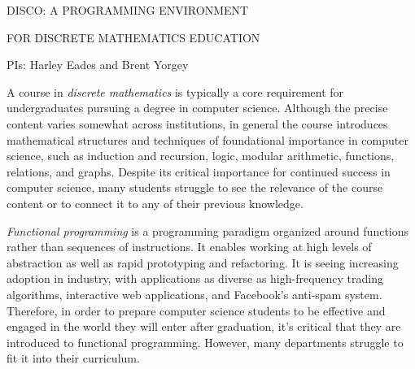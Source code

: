 \centerline{\Large DISCO: A PROGRAMMING ENVIRONMENT}
\vspace{1ex}
\centerline{\Large FOR DISCRETE MATHEMATICS EDUCATION}
\vspace{3ex}
\centerline{\large PIs: Harley Eades and Brent Yorgey}
\vspace{3ex}

\begin{comment}
  The proposal must contain a summary of the proposed activity suitable
  for publication, not more than one page in length. It should not be an
  abstract of the proposal, but rather a self-contained description of the
  activity that would result if the proposal were funded. The summary
  should be written in the third person and include a statement of
  objectives and methods to be employed. It must clearly address in
  separate statements (within the one-page summary): (1) the intellectual
  merit of the proposed activity; and (2) the broader impacts resulting
  from the proposed activity. (See Chapter III for further descriptive
  information on the NSF merit review criteria.) It should be informative
  to other persons working in the same or related fields and, insofar as
  possible, understandable to a scientifically or technically literate lay
  reader. Proposals that do not separately address both merit review
  criteria within the one page Project Summary will be returned without
  review.
\end{comment}

A course in \emph{discrete mathematics} is typically a core
requirement for undergraduates pursuing a degree in computer
science. Although the precise content varies somewhat across
institutions, in general the course introduces mathematical structures
and techniques of foundational importance in computer science, such as
induction and recursion, logic, modular arithmetic, functions,
relations, and graphs. Despite its critical importance for continued
success in computer science, many students struggle to see the
relevance of the course content or to connect it to any of their
previous knowledge.

\emph{Functional programming} is a programming paradigm organized
around functions rather than sequences of instructions.  It enables
working at high levels of abstraction as well as rapid prototyping and
refactoring. It is seeing increasing adoption in industry, with
applications as diverse as high-frequency trading algorithms,
interactive web applications, and Facebook's anti-spam system.
Therefore, in order to prepare computer science students to be
effective and engaged in the world they will enter after graduation,
it's critical that they are introduced to functional
programming. However, many departments struggle to fit it into their
curriculum.

